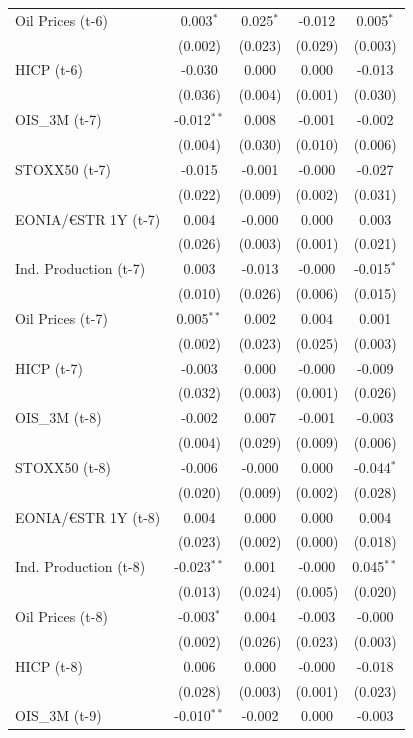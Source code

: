 \begin{longtable}[t]{lcccc}
Oil Prices (t-6) & 0.003$^{*}$ & 0.025$^{*}$ & -0.012 & 0.005$^{*}$\\
 & (0.002) & (0.023) & (0.029) & (0.003)\\
HICP (t-6) & -0.030 & 0.000 & 0.000 & -0.013\\
 & (0.036) & (0.004) & (0.001) & (0.030)\\
OIS\_3M (t-7) & -0.012$^{**}$ & 0.008 & -0.001 & -0.002\\
 & (0.004) & (0.030) & (0.010) & (0.006)\\
STOXX50 (t-7) & -0.015 & -0.001 & -0.000 & -0.027\\
 & (0.022) & (0.009) & (0.002) & (0.031)\\
EONIA/€STR 1Y (t-7) & 0.004 & -0.000 & 0.000 & 0.003\\
 & (0.026) & (0.003) & (0.001) & (0.021)\\
Ind. Production (t-7) & 0.003 & -0.013 & -0.000 & -0.015$^{*}$\\
 & (0.010) & (0.026) & (0.006) & (0.015)\\
Oil Prices (t-7) & 0.005$^{**}$ & 0.002 & 0.004 & 0.001\\
 & (0.002) & (0.023) & (0.025) & (0.003)\\
HICP (t-7) & -0.003 & 0.000 & -0.000 & -0.009\\
 & (0.032) & (0.003) & (0.001) & (0.026)\\
OIS\_3M (t-8) & -0.002 & 0.007 & -0.001 & -0.003\\
 & (0.004) & (0.029) & (0.009) & (0.006)\\
STOXX50 (t-8) & -0.006 & -0.000 & 0.000 & -0.044$^{*}$\\
 & (0.020) & (0.009) & (0.002) & (0.028)\\
EONIA/€STR 1Y (t-8) & 0.004 & 0.000 & 0.000 & 0.004\\
 & (0.023) & (0.002) & (0.000) & (0.018)\\
Ind. Production (t-8) & -0.023$^{**}$ & 0.001 & -0.000 & 0.045$^{**}$\\
 & (0.013) & (0.024) & (0.005) & (0.020)\\
Oil Prices (t-8) & -0.003$^{*}$ & 0.004 & -0.003 & -0.000\\
 & (0.002) & (0.026) & (0.023) & (0.003)\\
HICP (t-8) & 0.006 & 0.000 & -0.000 & -0.018\\
 & (0.028) & (0.003) & (0.001) & (0.023)\\
OIS\_3M (t-9) & -0.010$^{**}$ & -0.002 & 0.000 & -0.003\\

\end{longtable}
